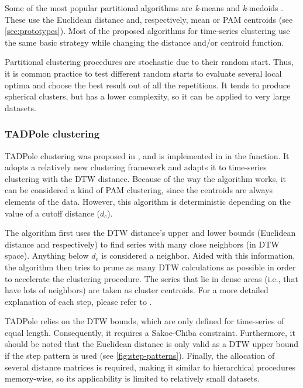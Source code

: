 Some of the most popular partitional algorithms are \textit{k}-means and \textit{k}-medoids \citep{hastie2009}.
These use the Euclidean distance and, respectively, mean or PAM centroids (see \cref{sec:prototypes}).
Most of the proposed algorithms for time-series clustering use the same basic strategy while changing the distance and/or centroid function.

Partitional clustering procedures are stochastic due to their random start.
Thus, it is common practice to test different random starts to evaluate several local optima and choose the best result out of all the repetitions.
It tends to produce spherical clusters,
but has a lower complexity,
so it can be applied to very large datasets.

\subsubsection{TADPole clustering}
\label{sec:tadpole}

TADPole clustering was proposed in \citet{begum2015},
and is implemented in \dtwclust{} in the  function.
It adopts a relatively new clustering framework and adapts it to time-series clustering with the DTW distance.
Because of the way the algorithm works,
it can be considered a kind of PAM clustering,
since the centroids are always elements of the data.
However, this algorithm is deterministic depending on the value of a cutoff distance ($d_c$).

The algorithm first uses the DTW distance's upper and lower bounds (Euclidean distance and  respectively) to find series with many close neighbors (in DTW space).
Anything below $d_c$ is considered a neighbor.
Aided with this information,
the algorithm then tries to prune as many DTW calculations as possible in order to accelerate the clustering procedure.
The series that lie in dense areas (i.e., that have lots of neighbors) are taken as cluster centroids.
For a more detailed explanation of each step,
please refer to \citet{begum2015}.

TADPole relies on the DTW bounds,
which are only defined for time-series of equal length.
Consequently, it requires a Sakoe-Chiba constraint.
Furthermore, it should be noted that the Euclidean distance is only valid as a DTW upper bound if the  step pattern is used (see \cref{fig:step-patterns}).
Finally, the allocation of several distance matrices is required,
making it similar to hierarchical procedures memory-wise,
so its applicability is limited to relatively small datasets.


